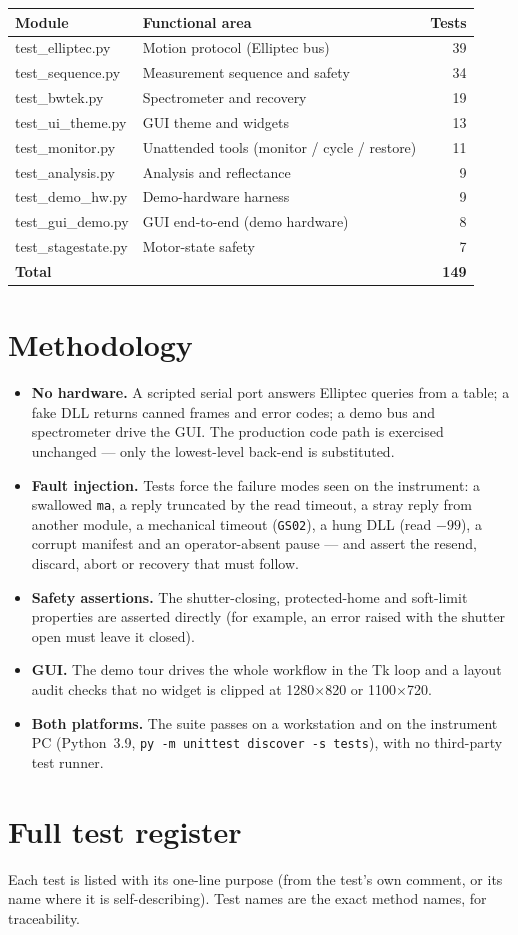 \documentclass[11pt]{article}
\newcommand{\code}[1]{\texttt{\small #1}}
\begin{document}
\begin{center}\small
\begin{tabular}{@{}>{\ttfamily}l l r@{}}
\toprule
\normalfont\textbf{Module} & \textbf{Functional area} & \textbf{Tests} \\
\midrule
test\_elliptec.py & Motion protocol (Elliptec bus) & 39 \\
test\_sequence.py & Measurement sequence and safety & 34 \\
test\_bwtek.py & Spectrometer and recovery & 19 \\
test\_ui\_theme.py & GUI theme and widgets & 13 \\
test\_monitor.py & Unattended tools (monitor / cycle / restore) & 11 \\
test\_analysis.py & Analysis and reflectance & 9 \\
test\_demo\_hw.py & Demo-hardware harness & 9 \\
test\_gui\_demo.py & GUI end-to-end (demo hardware) & 8 \\
test\_stagestate.py & Motor-state safety & 7 \\
\midrule
\normalfont\textbf{Total} & & \textbf{149} \\
\bottomrule
\end{tabular}
\end{center}

\section{Methodology}
\begin{itemize}
\item \textbf{No hardware.} A scripted serial port answers Elliptec queries from a table; a fake DLL
returns canned frames and error codes; a demo bus and spectrometer drive the GUI. The production code
path is exercised unchanged --- only the lowest-level back-end is substituted.
\item \textbf{Fault injection.} Tests force the failure modes seen on the instrument: a swallowed
\code{ma}, a reply truncated by the read timeout, a stray reply from another module, a mechanical
timeout (\code{GS02}), a hung DLL (read $-99$), a corrupt manifest and an operator-absent pause --- and
assert the resend, discard, abort or recovery that must follow.
\item \textbf{Safety assertions.} The shutter-closing, protected-home and soft-limit properties are
asserted directly (for example, an error raised with the shutter open must leave it closed).
\item \textbf{GUI.} The demo tour drives the whole workflow in the Tk loop and a layout audit checks
that no widget is clipped at 1280$\times$820 or 1100$\times$720.
\item \textbf{Both platforms.} The suite passes on a workstation and on the instrument PC
(Python~3.9, \code{py -m unittest discover -s tests}), with no third-party test runner.
\end{itemize}

\newpage
\section{Full test register}
\small Each test is listed with its one-line purpose (from the test's own comment, or its name where it
is self-describing). Test names are the exact method names, for traceability.
\normalsize


\end{document}
